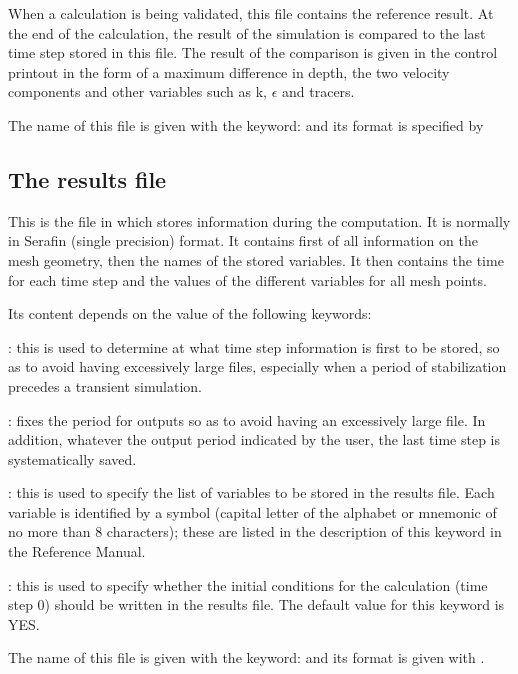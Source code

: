  When a calculation is being validated, this file contains the reference result. At the end of the calculation, the result of the simulation is compared to the last time step stored in this file. The result of the comparison is given in the control printout in the form of a maximum difference in depth, the two velocity components and other variables such as k, $\epsilon$ and tracers.

 The name of this file is given with the keyword:  and its format is specified by 


\subsection{ The results file}

 This is the file in which  stores information during the computation. It is normally in Serafin (single precision) format. It contains first of all information on the mesh geometry, then the names of the stored variables. It then contains the time for each time step and the values of the different variables for all mesh points.

 Its content depends on the value of the following keywords:

 : this is used to determine at what time step information is first to be stored, so as to avoid having excessively large files, especially when a period of stabilization precedes a transient simulation.

 : fixes the period for outputs so as to avoid having an excessively large file. In addition, whatever the output period indicated by the user, the last time step is systematically saved.

 : this is used to specify the list of variables to be stored in the results file. Each variable is identified by a symbol (capital letter of the alphabet or mnemonic of no more than 8 characters); these are listed in the description of this keyword in the Reference Manual.

  : this is used to specify whether the initial conditions for the calculation (time step 0) should be written in the results file. The default value for this keyword is YES.

 The name of this file is given with the keyword:  and its format is given with .


